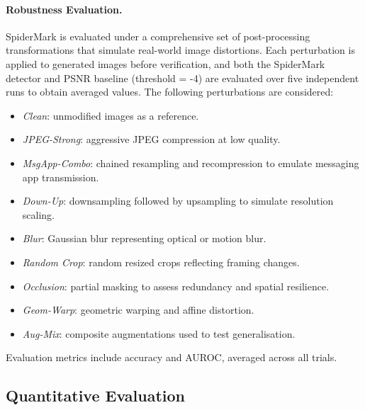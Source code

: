 \paragraph{Robustness Evaluation.}
SpiderMark is evaluated under a comprehensive set of post-processing transformations that simulate real-world image distortions. 
Each perturbation is applied to generated images before verification, and both the SpiderMark detector and PSNR baseline (threshold = -4) are evaluated over five independent runs to obtain averaged values. 
The following perturbations are considered:
\begin{itemize}
    \item \textit{Clean}: unmodified images as a reference.
    \item \textit{JPEG-Strong}: aggressive JPEG compression at low quality.
    \item \textit{MsgApp-Combo}: chained resampling and recompression to emulate messaging app transmission.
    \item \textit{Down-Up}: downsampling followed by upsampling to simulate resolution scaling.
    \item \textit{Blur}: Gaussian blur representing optical or motion blur.
    \item \textit{Random Crop}: random resized crops reflecting framing changes.
    \item \textit{Occlusion}: partial masking to assess redundancy and spatial resilience.
    \item \textit{Geom-Warp}: geometric warping and affine distortion.
    \item \textit{Aug-Mix}: composite augmentations used to test generalisation.
\end{itemize}
Evaluation metrics include accuracy and AUROC, averaged across all trials.

\subsection{Quantitative Evaluation}

